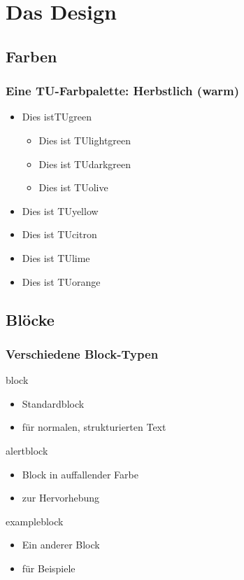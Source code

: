 \documentclass[9pt]{beamer}
\begin{document}
\section{Das Design}
\subsection{Farben}
\begin{frame}
    \frametitle{Eine TU-Farbpalette: Herbstlich (warm)}
    \begin{itemize}
        \item \textcolor{TUgreen}{Dies istTUgreen}
            \begin{itemize}
                \item \textcolor{TUlightgreen}{Dies ist TUlightgreen}
                \item \textcolor{TUdarkgreen}{Dies ist TUdarkgreen}
                \item \textcolor{TUolive}{Dies ist TUolive}
            \end{itemize}
        \item \textcolor{TUyellow}{Dies ist TUyellow}
        \item \textcolor{TUcitron}{Dies ist TUcitron}
        \item \textcolor{TUlime}{Dies ist TUlime}
        \item \textcolor{TUorange}{Dies ist TUorange}
    \end{itemize}
\end{frame}

\subsection{Blöcke}
\begin{frame}
    \frametitle{Verschiedene Block-Typen}
    \begin{block}{block}
        \begin{itemize}
            \item Standardblock
            \item für normalen, strukturierten Text
        \end{itemize}
    \end{block}
    \begin{alertblock}{alertblock}
        \begin{itemize}
            \item Block in auffallender Farbe
			\item zur Hervorhebung
        \end{itemize}
    \end{alertblock}
    \begin{exampleblock}{exampleblock}
        \begin{itemize}
            \item Ein anderer Block
			\item für Beispiele
        \end{itemize}
    \end{exampleblock}
\end{frame}
\end{document}
